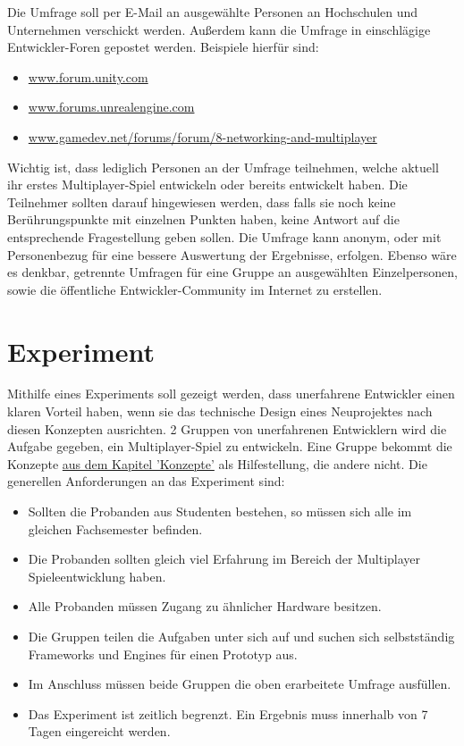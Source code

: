 Die Umfrage soll per E-Mail an ausgewählte Personen an Hochschulen und Unternehmen verschickt werden. Außerdem kann die Umfrage in einschlägige Entwickler-Foren gepostet werden. Beispiele hierfür sind:
\begin{itemize}
	\item \href{www.forum.unity.com}{www.forum.unity.com}
	\item \href{www.forums.unrealengine.com}{www.forums.unrealengine.com}
	\item \href{www.gamedev.net/forums/forum/8-networking-and-multiplayer}{www.gamedev.net/forums/forum/8-networking-and-multiplayer}
\end{itemize}

Wichtig ist, dass lediglich Personen an der Umfrage teilnehmen, welche aktuell ihr erstes Multiplayer-Spiel entwickeln oder bereits entwickelt haben. Die Teilnehmer sollten darauf hingewiesen werden, dass falls sie noch keine Berührungspunkte mit einzelnen Punkten haben, keine Antwort auf die entsprechende Fragestellung geben sollen. Die Umfrage kann anonym, oder mit Personenbezug für eine bessere Auswertung der Ergebnisse, erfolgen. Ebenso wäre es denkbar, getrennte Umfragen für eine Gruppe an ausgewählten Einzelpersonen, sowie die öffentliche Entwickler-Community im Internet zu erstellen.

\section{Experiment}

Mithilfe eines Experiments soll gezeigt werden, dass unerfahrene Entwickler einen klaren Vorteil haben, wenn sie das technische Design eines Neuprojektes nach diesen Konzepten ausrichten. 2 Gruppen von unerfahrenen Entwicklern wird die Aufgabe gegeben, ein Multiplayer-Spiel zu entwickeln. Eine Gruppe bekommt die Konzepte \hyperref[sec:konzepte]{aus dem Kapitel 'Konzepte'} als Hilfestellung, die andere nicht. Die generellen Anforderungen an das Experiment sind:

\begin{itemize}
	\item Sollten die Probanden aus Studenten bestehen, so müssen sich alle im gleichen Fachsemester befinden.
	\item Die Probanden sollten gleich viel Erfahrung im Bereich der Multiplayer Spieleentwicklung haben.
	\item Alle Probanden müssen Zugang zu ähnlicher Hardware besitzen.
	\item Die Gruppen teilen die Aufgaben unter sich auf und suchen sich selbstständig Frameworks und Engines für einen Prototyp aus.
	\item Im Anschluss müssen beide Gruppen die oben erarbeitete Umfrage ausfüllen.
	\item Das Experiment ist zeitlich begrenzt. Ein Ergebnis muss innerhalb von 7 Tagen eingereicht werden. 
\end{itemize}

